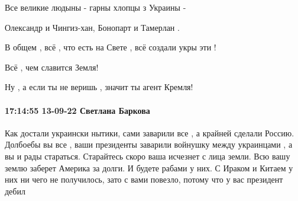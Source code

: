 Все великие людыны - гарны хлопцы з Украины -

Олександр и Чингиз-хан, Бонопарт и Тамерлан .

В общем , всё , что есть на Свете , всё создали укры эти !

Всё , чем славится Земля! 

Ну , а если ты не веришь , значит ты агент Кремля!

\paragraph{17:14:55 13-09-22 Светлана Баркова}

Как достали украински нытики, сами заварили все , а крайней сделали Россию.
Долбоебы вы все , ваши президенты заварили войнушку между украинцами , а вы и
рады стараться. Старайтесь скоро ваша исчезнет с лица земли. Всю вашу землю
заберет Америка за долги. И будете рабами у них. С Ираком и Китаем у них ни
чего не получилось, зато с вами повезло, потому что у вас президент дебил

